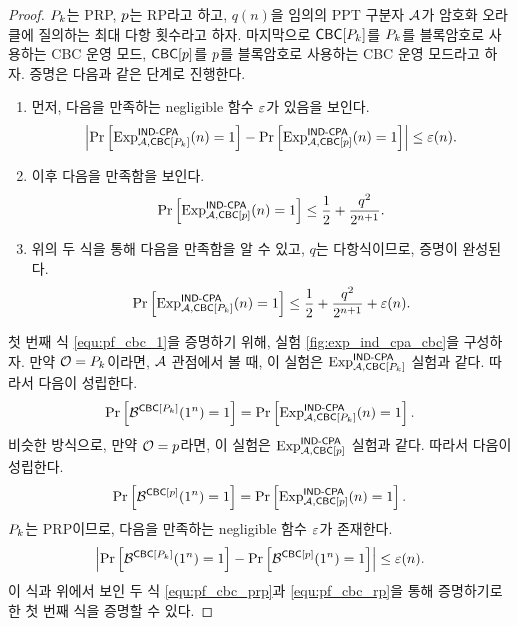 \begin{proof}
  $P_{k}$는 PRP, $p$는 RP라고 하고, $q(n)$을 임의의 PPT 구분자 $\mathcal{A}$가 암호화
  오라클에 질의하는 최대 다항 횟수라고 하자. 마지막으로 $\textsf{CBC}[P_{k}]$를 $P_{k}$를 블록암호로
  사용하는 CBC 운영 모드, $\textsf{CBC}[p]$를 $p$를 블록암호로 사용하는 CBC 운영 모드라고 하자.
  증명은 다음과 같은 단계로 진행한다.
  \begin{enumerate}
    \item 먼저, 다음을 만족하는 negligible 함수 $\varepsilon$가 있음을 보인다.
          \begin{equation} \label{equ:pf_cbc_1}
            \left| 
              \text{Pr} \left[ \text{Exp}_{\mathcal{A}, \textsf{CBC}[P_{k}]}^{\textsf{IND-CPA}}(n) = 1 \right] -
              \text{Pr} \left[ \text{Exp}_{\mathcal{A}, \textsf{CBC}[p]}^{\textsf{IND-CPA}}(n) = 1 \right]
             \right| \le \varepsilon(n).
          \end{equation}
    \item 이후 다음을 만족함을 보인다.
          \begin{equation} \label{equ:pf_cbc_2}
            \text{Pr} \left[ \text{Exp}_{\mathcal{A}, \textsf{CBC}[p]}^{\textsf{IND-CPA}}(n) = 1 \right]
            \le \frac{1}{2} + \frac{q^2}{2^{n + 1}}.
          \end{equation}
    \item 위의 두 식을 통해 다음을 만족함을 알 수 있고, $q$는 다항식이므로, 증명이 완성된다.
          \begin{equation}
            \text{Pr} \left[ \text{Exp}_{\mathcal{A}, \textsf{CBC}[P_{k}]}^{\textsf{IND-CPA}}(n) = 1 \right]
            \le \frac{1}{2} + \frac{q^2}{2^{n + 1}} + \varepsilon(n).
          \end{equation}
  \end{enumerate}

  첫 번째 식 \ref{equ:pf_cbc_1}을 증명하기 위해, 실험 \ref{fig:exp_ind_cpa_cbc}을
  구성하자. 만약 $\mathcal{O} = P_{k}$이라면, $\mathcal{A}$ 관점에서 볼 때, 이 실험은
  $\text{Exp}_{\mathcal{A}, \textsf{CBC}[P_{k}]}^{\textsf{IND-CPA}}$ 실험과 같다. 따라서 다음이 성립한다.
  \begin{equation} \label{equ:pf_cbc_prp}
    \text{Pr} \left[ \mathcal{B}^{\textsf{CBC}[P_{k}]}(1^n) = 1 \right] = \text{Pr} \left[ \text{Exp}_{\mathcal{A}, \textsf{CBC}[P_{k}]}^{\textsf{IND-CPA}}(n) = 1 \right].
  \end{equation}
  비슷한 방식으로, 만약 $\mathcal{O} = p$라면, 이 실험은 $\text{Exp}_{\mathcal{A}, \textsf{CBC}[p]}^{\textsf{IND-CPA}}$ 실험과 같다.
  따라서 다음이 성립한다.
  \begin{equation} \label{equ:pf_cbc_rp}
    \text{Pr} \left[ \mathcal{B}^{\textsf{CBC}[p]}(1^n) = 1 \right] = \text{Pr} \left[ \text{Exp}_{\mathcal{A}, \textsf{CBC}[p]}^{\textsf{IND-CPA}}(n) = 1 \right].
  \end{equation}
  $P_{k}$는 PRP이므로, 다음을 만족하는 negligible 함수 $\varepsilon$가 존재한다.
  \begin{equation}
    \left| 
      \text{Pr} \left[ \mathcal{B}^{\textsf{CBC}[P_{k}]}(1^n) = 1 \right] - \text{Pr} \left[ \mathcal{B}^{\textsf{CBC}[p]}(1^n) = 1 \right]
     \right| \le \varepsilon(n).
  \end{equation}
  이 식과 위에서 보인 두 식 \ref{equ:pf_cbc_prp}과 \ref{equ:pf_cbc_rp}을 통해 증명하기로한
  첫 번째 식을 증명할 수 있다.


\end{proof}
